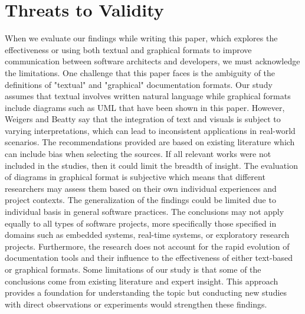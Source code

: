 \documentclass{acm_proc_article-sp}
\begin{document}
\section{Threats to Validity}
When we evaluate our findings while writing this paper, which explores the effectiveness or using both textual and graphical formats to improve communication between software architects and developers, we must acknowledge the limitations.
\newline
One challenge that this paper faces is the ambiguity of the definitions of "textual" and "graphical" documentation formats. Our study assumes that textual involves written natural language while graphical formats include diagrams such as UML that have been shown in this paper. However, Weigers and Beatty say that the integration of text and visuals is subject to varying interpretations, which can lead to inconsistent applications in real-world scenarios. \cite{Lamport:SoftwareRequirements}
\newline
The recommendations provided are based on existing literature which can include bias when selecting the sources. If all relevant works were not included in the studies, then it could limit the breadth of insight. The evaluation of diagrams in graphical format is subjective which means that different researchers may assess them based on their own individual experiences and project contexts.
\newline
The generalization of the findings could be limited due to individual basis in general software practices. The conclusions may not apply equally to all types of software projects, more specifically those specified in domains such as embedded systems, real-time systems, or exploratory research projects. Furthermore, the research does not account for the rapid evolution of documentation tools and their influence to the effectiveness of either text-based or graphical formats.
\newline
Some limitations of our study is that some of the conclusions come from existing literature and expert insight. This approach provides a foundation for understanding the topic but conducting new studies with direct observations or experiments would strengthen these findings.
\newline
\newline
\end{document}
